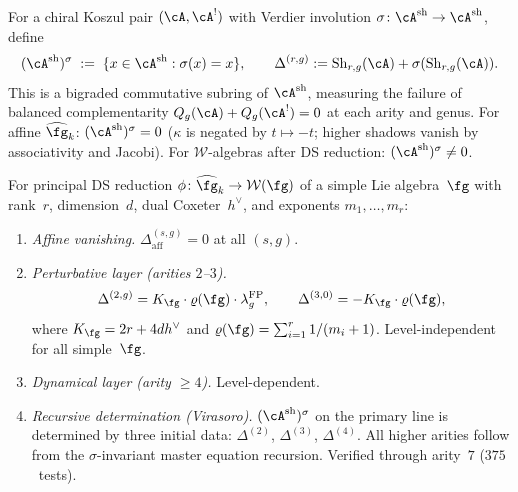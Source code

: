 \begin{definition}
\label{def:sigma-invariant-shadow-ring-main}
\ClaimStatusProvedHere
{}
For a chiral Koszul pair $(\cA, \cA^!)$ with Verdier involution
$\sigma\colon \cA^{\mathrm{sh}} \to \cA^{\mathrm{sh}}$, define
\begin{equation}\label{eq:sigma-ring-main}
(\cA^{\mathrm{sh}})^\sigma
\;:=\;
\{x \in \cA^{\mathrm{sh}} : \sigma(x) = x\},
\qquad
\Delta^{(r,g)} := \operatorname{Sh}_{r,g}(\cA) + \sigma(\operatorname{Sh}_{r,g}(\cA)).
\end{equation}
This is a bigraded commutative subring of $\cA^{\mathrm{sh}}$,
measuring the failure of balanced complementarity
$Q_g(\cA) + Q_g(\cA^!) = 0$ at each arity and genus.
For affine $\widehat{\fg}_k$: $(\cA^{\mathrm{sh}})^\sigma = 0$
($\kappa$ is negated by $t \mapsto -t$; higher shadows vanish
by associativity and Jacobi).
For $\mathcal{W}$-algebras after DS reduction:
$(\cA^{\mathrm{sh}})^\sigma \neq 0$.
\end{definition}

\begin{theorem}
\label{thm:ds-complementarity-tower-main}
For principal DS reduction $\phi\colon \widehat{\fg}_k \to
\mathcal{W}(\fg)$ of a simple Lie algebra~$\fg$ with rank~$r$,
dimension~$d$, dual Coxeter~$h^\vee$, and
exponents $m_1, \ldots, m_r$:
\begin{enumerate}[label=\textup{(\roman*)}]
\item \emph{Affine vanishing.}
  $\Delta_{\mathrm{aff}}^{(s,g)} = 0$ at all $(s,g)$.
\item \emph{Perturbative layer \textup{(}arities $2$--$3$\textup{)}.}
  \begin{equation}\label{eq:ds-tower-main}
  \Delta^{(2,g)} = K_\fg \cdot \varrho(\fg) \cdot
  \lambda_g^{\mathrm{FP}},
  \qquad
  \Delta^{(3,0)} = -K_\fg \cdot \varrho(\fg),
  \end{equation}
  where $K_\fg = 2r + 4dh^\vee$ and
  $\varrho(\fg) = \sum_{i=1}^r 1/(m_i+1)$.
  Level-independent for all simple~$\fg$.
\item \emph{Dynamical layer \textup{(}arity $\geq 4$\textup{)}.}
  Level-dependent.
\item \emph{Recursive determination \textup{(}Virasoro\textup{)}.}
  $(\cA^{\mathrm{sh}})^\sigma$ on the primary line is determined by
  three initial data:
  $\Delta^{(2)}$, $\Delta^{(3)}$, $\Delta^{(4)}$.
  All higher arities follow from the $\sigma$-invariant
  master equation recursion.
  Verified through arity~$7$ \textup{(}$375$~tests\textup{)}.
\end{enumerate}
\end{theorem}

